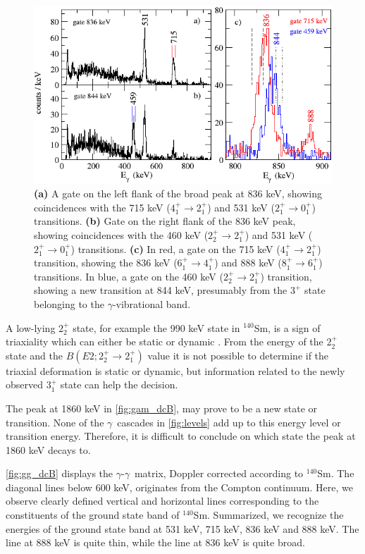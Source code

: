 \documentclass[twoside,english]{uiofysmaster/uiofysmaster}
\newcommand{\Sm}{$^{140}$Sm} %
\newcommand{\ga}{$\gamma$}
\let\orgautoref\autoref
\renewcommand{\autoref}
        {%
		 \def\sectionautorefname{Section}%
		 \def\subsectionautorefname{Section}%
		 \def\subsubsectionautorefname{Section}%
		 \def\chapterautorefname{Chapter}%
          \orgautoref}
\begin{document}
\begin{figure}[htb]
	\centering
	\includegraphics[width=\textwidth]{Images/check_state.png}
	\caption{\textbf{(a)} A gate on the left flank of the broad peak at 836 keV, showing coincidences with the 715 keV ($4_1^+ \rightarrow 2_1^+$) and 531 keV ($2_1^+ \rightarrow 0_1^+$) transitions.
	\textbf{(b)} Gate on the right flank of the 836 keV peak, showing coincidences with the 460 keV ($2_2^+ \rightarrow 2_1^+$) and 531 keV ($2_1^+ \rightarrow 0_1^+$) transitions.
	\textbf{(c)} In red, a gate on the 715 keV ($4_1^+ \rightarrow 2_1^+$) transition, showing the 836 keV ($6_1^+ \rightarrow 4_1^+$) and 888 keV ($8_1^+ \rightarrow 6_1^+$) transitions. In blue, a gate on the 460 keV ($2_2^+ \rightarrow 2_1^+$) transition, showing a new transition at 844 keV, presumably from the $3^+$ state belonging to the \ga-vibrational band.}
	\label{fig:check_state}
\end{figure}


A low-lying $2_2^+$ state, for example the 990 keV state in \Sm, is a sign of triaxiality which can either be static or dynamic \cite{Klintefjord2016}.
From the energy of the $2_2^+$ state and the $B(E2; 2_2^+ \rightarrow 2_1^+)$ value it is not possible to determine if the triaxial deformation is static or dynamic, but information related to the newly observed $3_1^+$ state can help the decision.

The peak at 1860 keV in \autoref{fig:gam_dcB}, may prove to be a new state or transition. 
None of the \ga\ cascades in \autoref{fig:levels} add up to this energy level or transition energy. 
Therefore, it is difficult to conclude on which state the peak at 1860 keV decays to.

\autoref{fig:gg_dcB} displays the \ga-\ga\ matrix, Doppler corrected according to \Sm.
The diagonal lines below 600 keV, originates from the Compton continuum. 
Here, we observe clearly defined vertical and horizontal lines corresponding to the constituents of the ground state band of \Sm. 
Summarized, we recognize the energies of the ground state band at 531 keV, 715 keV, 836 keV and 888 keV. The line at 888 keV is quite thin, while the line at 836 keV is quite broad. 
\end{document}
